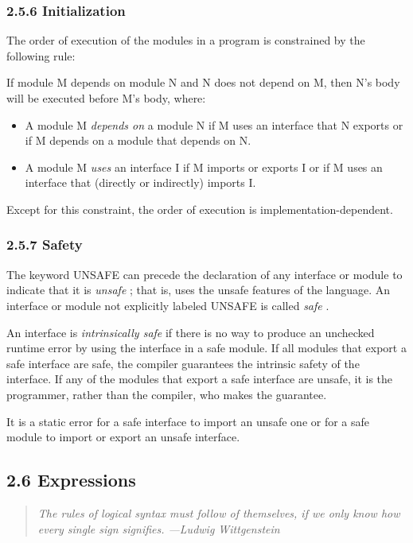 \documentclass[10pt]{article}
\begin{document}
\subsubsection*{2.5.6 Initialization}

The order of execution of the modules in a program is constrained by the
following rule:

If module M depends on module N and N does not depend on M, then N's body will
be executed before M's body, where:
\begin{itemize}
\item A module M \emph{depends on} a module N if M uses an interface that N
  exports or if M depends on a module that depends on N.
\item A module M \emph{uses} an interface I if M imports or exports I or if M
  uses an interface that (directly or indirectly) imports I.
\end{itemize}

Except for this constraint, the order of execution is implementation-dependent.

\subsubsection*{2.5.7 Safety}

The keyword UNSAFE can precede the declaration of any interface or module to
indicate that it is \emph{unsafe} ; that is, uses the unsafe features of the
language. An interface or module not explicitly labeled UNSAFE is called
\emph{safe} .

An interface is \emph{intrinsically safe} if there is no way to produce an
unchecked runtime error by using the interface in a safe module. If all
modules that export a safe interface are safe, the compiler guarantees the
intrinsic safety of the interface. If any of the modules that export a safe
interface are unsafe, it is the programmer, rather than the compiler, who
makes the guarantee.

It is a static error for a safe interface to import an unsafe one or for a
safe module to import or export an unsafe interface.

\subsection*{2.6 Expressions}

\begin{quote}
  \emph{ The rules of logical syntax must follow of themselves, if we only know how every single sign signifies. ---Ludwig Wittgenstein }
\end{quote}
\end{document}
